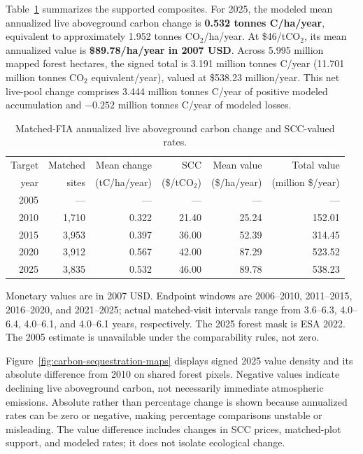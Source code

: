 \documentclass[11pt]{article}
\begin{document}
Table~\ref{tab:carbon-sequestration-results} summarizes the supported composites. For 2025, the modeled mean annualized live aboveground carbon change is \textbf{0.532 tonnes C/ha/year}, equivalent to approximately 1.952 tonnes CO$_2$/ha/year. At \$46/tCO$_2$, its mean annualized value is \textbf{\$89.78/ha/year in 2007 USD}. Across 5.995 million mapped forest hectares, the signed total is 3.191 million tonnes C/year (11.701 million tonnes CO$_2$ equivalent/year), valued at \$538.23 million/year. This net live-pool change comprises 3.444 million tonnes C/year of positive modeled accumulation and $-0.252$ million tonnes C/year of modeled losses. 

\begin{table}[htbp]
\centering
\caption{Matched-FIA annualized live aboveground carbon change and SCC-valued rates.}
\label{tab:carbon-sequestration-results}
\small
\begin{tabular}{@{}rrrrrr@{}}
\toprule
Target & Matched & Mean change & SCC & Mean value & Total value \\
year & sites & (tC/ha/year) & (\$/tCO$_2$) & (\$/ha/year) & (million \$/year) \\
\midrule
2005 & --- & --- & --- & --- & --- \\
2010 & 1,710 & 0.322 & 21.40 & 25.24 & 152.01 \\
2015 & 3,953 & 0.397 & 36.00 & 52.39 & 314.45 \\
2020 & 3,912 & 0.567 & 42.00 & 87.29 & 523.52 \\
2025 & 3,835 & 0.532 & 46.00 & 89.78 & 538.23 \\
\bottomrule
\end{tabular}

\smallskip
\begin{minipage}{0.95\linewidth}
\footnotesize 
Monetary values are in 2007 USD. Endpoint windows are 2006--2010, 2011--2015, 2016--2020, and 2021--2025; actual matched-visit intervals range from 3.6--6.3, 4.0--6.4, 4.0--6.1, and 4.0--6.1 years, respectively. The 2025 forest mask is ESA 2022. The 2005 estimate is unavailable under the comparability rules, not zero.
\end{minipage}
\end{table}

Figure~\ref{fig:carbon-sequestration-maps} displays signed 2025 value density and its absolute difference from 2010 on shared forest pixels. Negative values indicate declining live aboveground carbon, not necessarily immediate atmospheric emissions. Absolute rather than percentage change is shown because annualized rates can be zero or negative, making percentage comparisons unstable or misleading. The value difference includes changes in SCC prices, matched-plot support, and modeled rates; it does not isolate ecological change.
\end{document}
